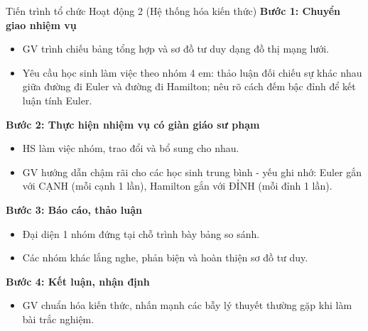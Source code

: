 \documentclass[12pt, a4paper]{article}
\begin{document}
\begin{pedabox}{Tiến trình tổ chức Hoạt động 2 (Hệ thống hóa kiến thức)}
    \textbf{Bước 1: Chuyển giao nhiệm vụ}
    \begin{itemize}[leftmargin=0.6cm]
        \item GV trình chiếu bảng tổng hợp và sơ đồ tư duy dạng đồ thị mạng lưới.
        \item Yêu cầu học sinh làm việc theo nhóm 4 em: thảo luận đối chiếu sự khác nhau giữa đường đi Euler và đường đi Hamilton; nêu rõ cách đếm bậc đỉnh để kết luận tính Euler.
    \end{itemize}

    \textbf{Bước 2: Thực hiện nhiệm vụ có giàn giáo sư phạm}
    \begin{itemize}[leftmargin=0.6cm]
        \item HS làm việc nhóm, trao đổi và bổ sung cho nhau.
        \item GV hướng dẫn chậm rãi cho các học sinh trung bình - yếu ghi nhớ: Euler gắn với CẠNH (mỗi cạnh 1 lần), Hamilton gắn với ĐỈNH (mỗi đỉnh 1 lần).
    \end{itemize}

    \textbf{Bước 3: Báo cáo, thảo luận}
    \begin{itemize}[leftmargin=0.6cm]
        \item Đại diện 1 nhóm đứng tại chỗ trình bày bảng so sánh.
        \item Các nhóm khác lắng nghe, phản biện và hoàn thiện sơ đồ tư duy.
    \end{itemize}

    \textbf{Bước 4: Kết luận, nhận định}
    \begin{itemize}[leftmargin=0.6cm]
        \item GV chuẩn hóa kiến thức, nhấn mạnh các bẫy lý thuyết thường gặp khi làm bài trắc nghiệm.
    \end{itemize}
\end{pedabox}
\end{document}
